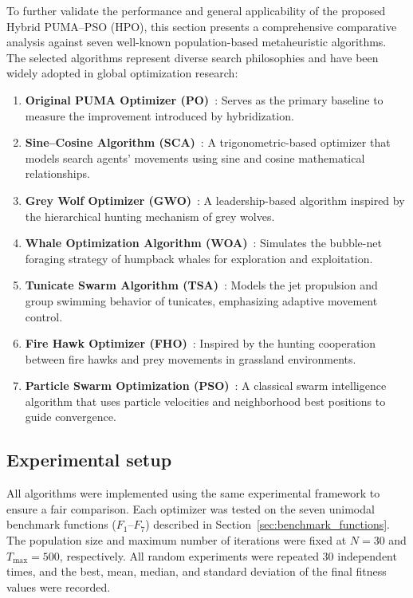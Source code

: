 \documentclass[a4paper,12pt]{article}
\begin{document}
To further validate the performance and general applicability of the proposed Hybrid PUMA--PSO (HPO), this section presents a comprehensive comparative analysis against seven well-known population-based metaheuristic algorithms. The selected algorithms represent diverse search philosophies and have been widely adopted in global optimization research:

\begin{enumerate}[label=(\roman*)]
  \item \textbf{Original PUMA Optimizer (PO)}~\cite{abdollahzadeh2023puma}: Serves as the primary baseline to measure the improvement introduced by hybridization.
  \item \textbf{Sine--Cosine Algorithm (SCA)}~\cite{mirjalili2016sca}: A trigonometric-based optimizer that models search agents' movements using sine and cosine mathematical relationships.
  \item \textbf{Grey Wolf Optimizer (GWO)}~\cite{mirjalili2014gwo}: A leadership-based algorithm inspired by the hierarchical hunting mechanism of grey wolves.
  \item \textbf{Whale Optimization Algorithm (WOA)}~\cite{mirjalili2016woa}: Simulates the bubble-net foraging strategy of humpback whales for exploration and exploitation.
  \item \textbf{Tunicate Swarm Algorithm (TSA)}~\cite{kaur2020tsa}: Models the jet propulsion and group swimming behavior of tunicates, emphasizing adaptive movement control.
  \item \textbf{Fire Hawk Optimizer (FHO)}~\cite{azizi2022fho}: Inspired by the hunting cooperation between fire hawks and prey movements in grassland environments.
  \item \textbf{Particle Swarm Optimization (PSO)}~\cite{kennedy1995pso}: A classical swarm intelligence algorithm that uses particle velocities and neighborhood best positions to guide convergence.
\end{enumerate}

\subsection{Experimental setup}
All algorithms were implemented using the same experimental framework to ensure a fair comparison. Each optimizer was tested on the seven unimodal benchmark functions ($F_1$--$F_7$) described in Section~\ref{sec:benchmark_functions}. The population size and maximum number of iterations were fixed at $N=30$ and $T_{\max}=500$, respectively. All random experiments were repeated $30$ independent times, and the best, mean, median, and standard deviation of the final fitness values were recorded.
\end{document}
